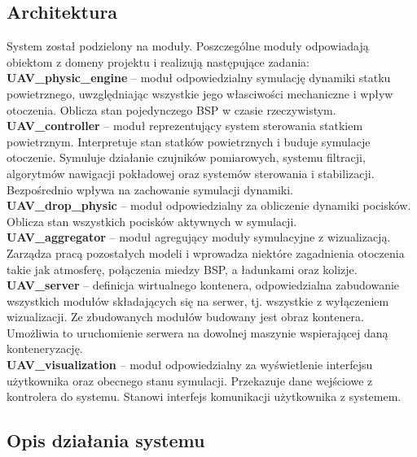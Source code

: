 \documentclass[15pt]{sprawozdanie}
\begin{document}
\subsection{Architektura}

System został podzielony na moduły. Poszczególne moduły odpowiadają obiektom z domeny projektu i realizują następujące zadania:\\

\textbf{UAV\_physic\_engine} -- moduł odpowiedzialny symulację dynamiki statku powietrznego, uwzględniając wszystkie jego własciwości mechaniczne i wpływ otoczenia. Oblicza stan pojedynczego BSP w czasie rzeczywistym. \\

\textbf{UAV\_controller} -- moduł reprezentujący system sterowania statkiem powietrznym. Interpretuje stan statków powietrznych i buduje symulacje otoczenie. Symuluje działanie czujników pomiarowych, systemu filtracji, algorytmów nawigacji pokładowej oraz systemów sterowania i stabilizacji. Bezpośrednio wpływa na zachowanie symulacji dynamiki.\\

\textbf{UAV\_drop\_physic} -- moduł odpowiedzialny za obliczenie dynamiki pocisków. Oblicza stan wszystkich pocisków aktywnych w symulacji.\\

\textbf{UAV\_aggregator} -- moduł agregujący moduły symulacyjne z wizualizacją. Zarządza pracą pozostałych modeli i wprowadza niektóre zagadnienia otoczenia takie jak atmosferę, połączenia miedzy BSP, a ładunkami oraz kolizje.\\

\textbf{UAV\_server} -- definicja wirtualnego kontenera, odpowiedzialna zabudowanie wszystkich modułów składających się na serwer, tj. wszystkie z wyłączeniem wizualizacji. Ze zbudowanych modułów budowany jest obraz kontenera. Umożliwia to uruchomienie serwera na dowolnej maszynie wspierającej daną konteneryzację.\\

\textbf{UAV\_visualization} -- moduł odpowiedzialny za wyświetlenie  interfejsu użytkownika oraz obecnego stanu symulacji. Przekazuje dane wejściowe z kontrolera do systemu. Stanowi interfejs komunikacji użytkownika z systemem. \\

\newpage

\subsection{Opis działania systemu}
\end{document}
